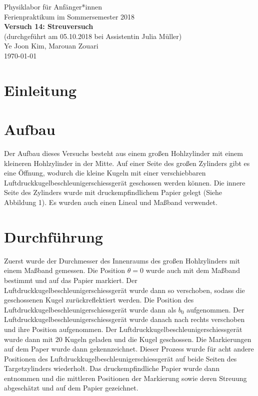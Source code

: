 \documentclass[11pt,a4paper]{article}
\begin{document}
	

{
	\centering 
	\large 
	Physiklabor für Anfänger*innen \\
	Ferienpraktikum im Sommersemester 2018 \\[4mm]
	\textbf{\LARGE 
		Versuch 14: Streuversuch
	} \\[3mm]
	(durchgeführt am 05.10.2018 bei Assistentin Julia Müller) \\
	Ye Joon Kim, Marouan Zouari\\
	\today \\[10mm]
}

\tableofcontents
\section{Einleitung}



\section{Aufbau}
Der Aufbau dieses Versuchs besteht aus einem großen Hohlzylinder mit einem kleineren Hohlzylinder in der Mitte. Auf einer Seite des großen Zylinders gibt es eine Öffnung, wodurch die kleine Kugeln mit einer verschiebbaren Luftdruckkugelbeschleunigerschiessgerät geschossen werden können. Die innere Seite des Zylinders wurde mit druckempfindlichem Papier gelegt (Siehe Abbildung 1). Es wurden auch einen Lineal und Maßband verwendet. 


\section{Durchführung}
Zuerst wurde der Durchmesser des Innenraums des großen Hohlzylinders mit einem Maßband gemessen. Die Position $\theta = 0$ wurde auch mit dem Maßband bestimmt und auf das Papier markiert. Der Luftdruckkugelbeschleunigerschiessgerät wurde dann so verschoben, sodass die geschossenen Kugel zurückreflektiert werden. Die Position des Luftdruckkugelbeschleunigerschiessgerät wurde dann als $b_0$ aufgenommen. Der Luftdruckkugelbeschleunigerschiessgerät wurde danach nach rechts verschoben und ihre Position aufgenommen. Der Luftdruckkugelbeschleunigerschiessgerät wurde dann mit 20 Kugeln geladen und die Kugel geschossen. Die Markierungen auf dem Paper wurde dann gekennzeichnet. Dieser Prozess wurde für acht andere Positionen des Luftdruckkugelbeschleunigerschiessgerät auf beide Seiten des Targetzylinders wiederholt. Das druckempfindliche Papier wurde dann entnommen und die mittleren Positionen der Markierung sowie deren Streuung abgeschätzt und auf dem Papier gezeichnet. 
\end{document}
